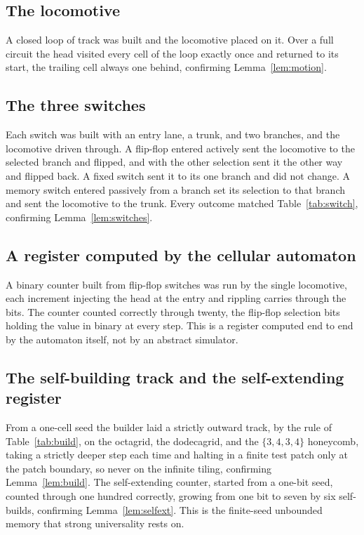 \subsection{The locomotive}

A closed loop of track was built and the locomotive placed on it. Over a full circuit the head visited every
cell of the loop exactly once and returned to its start, the trailing cell always one behind, confirming
Lemma~\ref{lem:motion}.

\subsection{The three switches}

Each switch was built with an entry lane, a trunk, and two branches, and the locomotive driven through. A
flip-flop entered actively sent the locomotive to the selected branch and flipped, and with the other selection
sent it the other way and flipped back. A fixed switch sent it to its one branch and did not change. A memory
switch entered passively from a branch set its selection to that branch and sent the locomotive to the trunk.
Every outcome matched Table~\ref{tab:switch}, confirming Lemma~\ref{lem:switches}.

\subsection{A register computed by the cellular automaton}

A binary counter built from flip-flop switches was run by the single locomotive, each increment injecting the
head at the entry and rippling carries through the bits. The counter counted correctly through twenty, the
flip-flop selection bits holding the value in binary at every step. This is a register computed end to end by
the automaton itself, not by an abstract simulator.

\subsection{The self-building track and the self-extending register}

From a one-cell seed the builder laid a strictly outward track, by the rule of Table~\ref{tab:build}, on the
octagrid, the dodecagrid, and the $\{3,4,3,4\}$ honeycomb, taking a strictly deeper step each time and halting
in a finite test patch only at the patch boundary, so never on the infinite tiling, confirming
Lemma~\ref{lem:build}. The self-extending counter, started from a one-bit seed, counted through one hundred
correctly, growing from one bit to seven by six self-builds, confirming Lemma~\ref{lem:selfext}. This is the
finite-seed unbounded memory that strong universality rests on.

